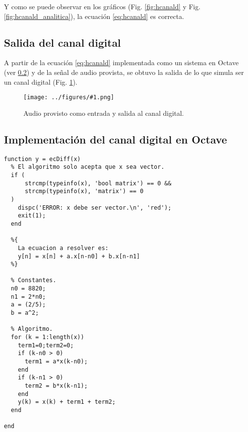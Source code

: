 \documentclass[letterpaper, 10 pt, conference]{ieeeconf}  %
\newcommand{\image}[2] {
  \begin{figure}[H]
    \centering
    \texttt{[image: ../figures/\#1.png]}
    \caption{#2}
    \label{fig:#1}
  \end{figure}
}
\begin{document}
Y como se puede observar en los gr\'aficos (Fig. \ref{fig:hcanald} y Fig. \ref{fig:hcanald_analitica}), la ecuaci\'on \ref{eq:hcanald} es correcta.

\subsection{Salida del canal digital}
A partir de la ecuaci\'on \ref{eq:hcanald} implementada como un sistema en Octave (ver \ref{code:ecdiff}) y de la se\~nal de audio provista, se obtuvo la salida de lo que simula ser un canal digital (Fig. \ref{fig:salidaCanalDigital}). 
\image{salidaCanalDigital}{Audio provisto como entrada y salida al canal digital.}

\subsection{Implementaci\'on del canal digital en Octave}
\label{code:ecdiff}
\begin{lstlisting}[style=Matlab-editor]
function y = ecDiff(x)
  % El algoritmo solo acepta que x sea vector.
  if (
      strcmp(typeinfo(x), 'bool matrix') == 0 &&
      strcmp(typeinfo(x), 'matrix') == 0
  )
    dispc('ERROR: x debe ser vector.\n', 'red');
    exit(1);
  end

  %{
    La ecuacion a resolver es:
    y[n] = x[n] + a.x[n-n0] + b.x[n-n1]
  %}

  % Constantes.
  n0 = 8820;
  n1 = 2*n0;
  a = (2/5);
  b = a^2;
  
  % Algoritmo.
  for (k = 1:length(x))
    term1=0;term2=0;
    if (k-n0 > 0)
      term1 = a*x(k-n0);
    end
    if (k-n1 > 0)
      term2 = b*x(k-n1);
    end
    y(k) = x(k) + term1 + term2;
  end

end
\end{lstlisting}
\end{document}
